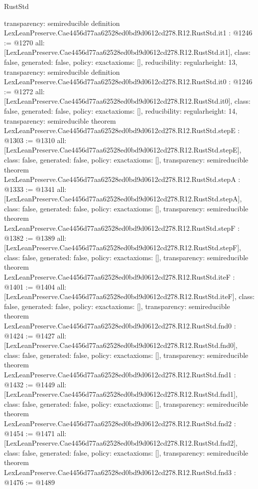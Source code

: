\begin{lexlean}{RustStd}
\begin{coremodule}
{  transparency: semireducible
}
definition LexLeanPreserve.Cae4456d77aa62528ed0bd9d0612cd278.R12.RustStd.it1 : @1246 := @1270 {
  all: [LexLeanPreserve.Cae4456d77aa62528ed0bd9d0612cd278.R12.RustStd.it1],
  class: false,
  generated: false,
  policy: exact{axioms: []},
  reducibility: regular{height: 13},
  transparency: semireducible
}
definition LexLeanPreserve.Cae4456d77aa62528ed0bd9d0612cd278.R12.RustStd.it0 : @1246 := @1272 {
  all: [LexLeanPreserve.Cae4456d77aa62528ed0bd9d0612cd278.R12.RustStd.it0],
  class: false,
  generated: false,
  policy: exact{axioms: []},
  reducibility: regular{height: 14},
  transparency: semireducible
}
theorem LexLeanPreserve.Cae4456d77aa62528ed0bd9d0612cd278.R12.RustStd.stepE : @1303 := @1310 {
  all: [LexLeanPreserve.Cae4456d77aa62528ed0bd9d0612cd278.R12.RustStd.stepE],
  class: false,
  generated: false,
  policy: exact{axioms: []},
  transparency: semireducible
}
theorem LexLeanPreserve.Cae4456d77aa62528ed0bd9d0612cd278.R12.RustStd.stepA : @1333 := @1341 {
  all: [LexLeanPreserve.Cae4456d77aa62528ed0bd9d0612cd278.R12.RustStd.stepA],
  class: false,
  generated: false,
  policy: exact{axioms: []},
  transparency: semireducible
}
theorem LexLeanPreserve.Cae4456d77aa62528ed0bd9d0612cd278.R12.RustStd.stepF : @1382 := @1389 {
  all: [LexLeanPreserve.Cae4456d77aa62528ed0bd9d0612cd278.R12.RustStd.stepF],
  class: false,
  generated: false,
  policy: exact{axioms: []},
  transparency: semireducible
}
theorem LexLeanPreserve.Cae4456d77aa62528ed0bd9d0612cd278.R12.RustStd.iteF : @1401 := @1404 {
  all: [LexLeanPreserve.Cae4456d77aa62528ed0bd9d0612cd278.R12.RustStd.iteF],
  class: false,
  generated: false,
  policy: exact{axioms: []},
  transparency: semireducible
}
theorem LexLeanPreserve.Cae4456d77aa62528ed0bd9d0612cd278.R12.RustStd.fnd0 : @1424 := @1427 {
  all: [LexLeanPreserve.Cae4456d77aa62528ed0bd9d0612cd278.R12.RustStd.fnd0],
  class: false,
  generated: false,
  policy: exact{axioms: []},
  transparency: semireducible
}
theorem LexLeanPreserve.Cae4456d77aa62528ed0bd9d0612cd278.R12.RustStd.fnd1 : @1432 := @1449 {
  all: [LexLeanPreserve.Cae4456d77aa62528ed0bd9d0612cd278.R12.RustStd.fnd1],
  class: false,
  generated: false,
  policy: exact{axioms: []},
  transparency: semireducible
}
theorem LexLeanPreserve.Cae4456d77aa62528ed0bd9d0612cd278.R12.RustStd.fnd2 : @1454 := @1471 {
  all: [LexLeanPreserve.Cae4456d77aa62528ed0bd9d0612cd278.R12.RustStd.fnd2],
  class: false,
  generated: false,
  policy: exact{axioms: []},
  transparency: semireducible
}
theorem LexLeanPreserve.Cae4456d77aa62528ed0bd9d0612cd278.R12.RustStd.fnd3 : @1476 := @1489 {
}
\end{coremodule}
\end{lexlean}
